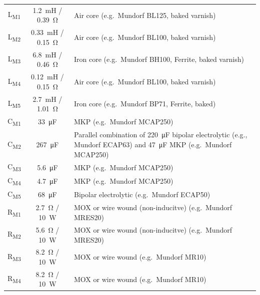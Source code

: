 \documentclass[12pt,a4paper]{article}
\providecommand{\inductor}[1]{L\textsubscript{#1}}
\providecommand{\capacitor}[1]{C\textsubscript{#1}}
\providecommand{\resistor}[1]{R\textsubscript{#1}}
\begin{document}
\begin{table}[p]
\begin{tabular}{ccp{}}
\inductor{M1}	& \SI{1.2}{mH} / \SI{0.39}{\ohm}	& Air core (e.g.~Mundorf BL125, baked varnish)\\
\inductor{M2}	& \SI{0.33}{mH} / \SI{0.15}{\ohm}	& Air core (e.g.~Mundorf BL100, baked varnish)\\
\inductor{M3}	& \SI{6.8}{mH} / \SI{0.46}{\ohm}	& Iron core (e.g.~Mundorf BH100, Ferrite, baked varnish)\\
\inductor{M4}	& \SI{0.12}{mH} / \SI{0.15}{\ohm}	& Air core (e.g.~Mundorf BL100, baked varnish)\\
\inductor{M5}	& \SI{2.7}{mH} / \SI{1.01}{\ohm}	& Iron core (e.g.~Mundorf BP71, Ferrite, baked)\\
\capacitor{M1}	& \SI{33}{\micro F}			& MKP (e.g.~Mundorf MCAP250)\\
\capacitor{M2}	& \SI{267}{\micro F}			& Parallel combination of \SI{220}{\micro F} bipolar electrolytic (e.g., Mundorf ECAP63) and \SI{47}{\micro F} MKP (e.g.~Mundorf MCAP250)\\
\capacitor{M3}	& \SI{5.6}{\micro F}			& MKP (e.g.~Mundorf MCAP250)\\
\capacitor{M4}	& \SI{4.7}{\micro F}			& MKP (e.g.~Mundorf MCAP250)\\
\capacitor{M5}	& \SI{68}{\micro F}			& Bipolar electrolytic (e.g.~Mundorf ECAP50)\\
\resistor{M1}	& \SI{2.7}{\ohm} / \SI{10}{W}		& MOX or wire wound (non-inducitve) (e.g.~Mundorf MRES20)\\
\resistor{M2}	& \SI{5.6}{\ohm} / \SI{10}{W}		& MOX or wire wound (non-inducitve) (e.g.~Mundorf MRES20)\\
\resistor{M3}	& \SI{8.2}{\ohm} / \SI{10}{W}		& MOX or wire wound (e.g.~Mundorf MR10)\\
\resistor{M4}	& \SI{8.2}{\ohm} / \SI{10}{W}		& MOX or wire wound (e.g.~Mundorf MR10)\\

\midrule


\end{tabular}
\end{table}
\end{document}
